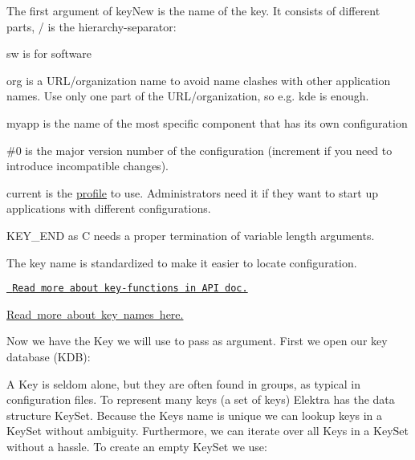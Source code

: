 \begin{DoxyItemize}
\item The first argument of {\ttfamily key\+New} is the name of the key. It consists of different parts, {\ttfamily /} is the hierarchy-\/separator\+:
\begin{DoxyItemize}
\item {\ttfamily sw} is for software
\item {\ttfamily org} is a U\+R\+L/organization name to avoid name clashes with other application names. Use only one part of the U\+R\+L/organization, so e.\+g. {\ttfamily kde} is enough.
\item {\ttfamily myapp} is the name of the most specific component that has its own configuration
\item {\ttfamily \#0} is the major version number of the configuration (increment if you need to introduce incompatible changes).
\item {\ttfamily current} is the \mbox{\hyperlink{autotoc_md536_src_plugins_profile_README_md}{profile}} to use. Administrators need it if they want to start up applications with different configurations.
\end{DoxyItemize}
\item {\ttfamily K\+E\+Y\+\_\+\+E\+ND} as C needs a proper termination of variable length arguments.
\end{DoxyItemize}

The key name is standardized to make it easier to locate configuration.


\begin{DoxyItemize}
\item \href{https://doc.libelektra.org/api/current/html/group__key.html}{\texttt{ Read more about key-\/functions in A\+PI doc.}}
\item \mbox{\hyperlink{doc_help_elektra-key-names_md}{Read more about key names here.}}
\end{DoxyItemize}

Now we have the {\ttfamily Key} we will use to pass as argument. First we open our key database (K\+DB)\+:


\begin{DoxyCode}{0}
\end{DoxyCode}


A {\ttfamily Key} is seldom alone, but they are often found in groups, as typical in configuration files. To represent many keys (a set of keys) Elektra has the data structure {\ttfamily Key\+Set}. Because the {\ttfamily Key}\textquotesingle{}s name is unique we can lookup keys in a {\ttfamily Key\+Set} without ambiguity. Furthermore, we can iterate over all {\ttfamily Key}s in a {\ttfamily Key\+Set} without a hassle. To create an empty {\ttfamily Key\+Set} we use\+:


